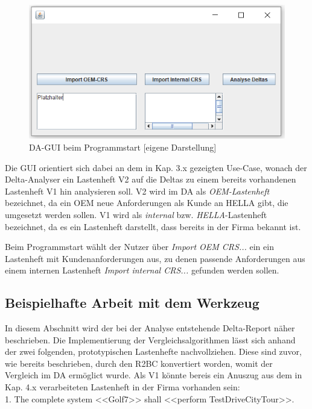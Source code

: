 \documentclass[12pt]{report}
\begin{document}
\begin{figure}[h!]
\begin{center}
\includegraphics[scale=0.7]{Bilder/DA-GUI-leer.png}
\caption{DA-GUI beim Programmstart [eigene Darstellung]}
\end{center}
\end{figure}
Die GUI orientiert sich dabei an dem in Kap. 3.x gezeigten Use-Case, wonach der Delta-Analyser ein Lastenheft V2 auf die Deltas zu einem bereits vorhandenen Lastenheft V1 hin analysieren soll. V2 wird im DA als \textit{OEM-Lastenheft} bezeichnet, da ein OEM neue Anforderungen als Kunde an HELLA gibt, die umgesetzt werden sollen. V1 wird als \textit{internal} bzw. \textit{HELLA}-Lastenheft bezeichnet, da es ein Lastenheft darstellt, dass bereits in der Firma bekannt ist.

Beim Programmstart wählt der Nutzer über \textit{Import OEM CRS...} ein ein Lastenheft mit Kundenanforderungen aus, zu denen passende Anforderungen aus einem internen Lastenheft \textit{Import internal CRS... }gefunden werden sollen. 

\subsection{Beispielhafte Arbeit mit dem Werkzeug}
In diesem Abschnitt wird der bei der Analyse entstehende Delta-Report näher beschrieben. Die Implementierung der Vergleichsalgorithmen lässt sich anhand der zwei folgenden, prototypischen Lastenhefte nachvollziehen. Diese sind zuvor, wie bereits beschrieben, durch den R2BC konvertiert worden, womit der Vergleich im DA ermöglict wurde. Als V1 könnte bereis ein Anuszug aus dem in Kap. 4.x verarbeiteten Lastenheft in der Firma vorhanden sein:\\

1. The complete system <<Golf7>> shall <<perform TestDriveCityTour>>.\\
\end{document}
